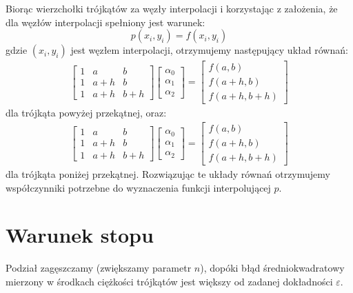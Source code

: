 \documentclass[12pt]{article}
\begin{document}
	Biorąc wierzchołki trójkątów za węzły interpolacji i korzystając z założenia, że dla węzłów interpolacji spełniony jest warunek:
	$$p(x_i, y_i) = f(x_i, y_i)$$
	gdzie $(x_i, y_i)$ jest węzłem interpolacji, otrzymujemy następujący układ równań:
	\begin{align*}
		\left[
			\begin{array}{ccc}
				1 &  a  &  b  \\
				1 & a+h &  b  \\
				1 & a+h & b+h
			\end{array}
		\right]
		\left[
			\begin{array}{c}
				\alpha_0 \\
				\alpha_1 \\
				\alpha_2
			\end{array}
		\right]
		=		
		\left[
			\begin{array}{c}
				  f(a, b)   \\
				 f(a+h, b)  \\
				f(a+h, b+h)
			\end{array}
		\right]
	\end{align*}
	dla trójkąta powyżej przekątnej, oraz:
	\begin{align*}
		\left[
			\begin{array}{ccc}
				1 &  a  &  b  \\
				1 & a+h &  b  \\
				1 & a+h & b+h
			\end{array}
		\right]
		\left[
			\begin{array}{c}
				\alpha_0 \\
				\alpha_1 \\
				\alpha_2
			\end{array}
		\right]
		=		
		\left[
			\begin{array}{c}
				  f(a, b)   \\
				 f(a+h, b)  \\
				f(a+h, b+h)
			\end{array}
		\right]
	\end{align*}
	dla trójkąta poniżej przekątnej. Rozwiązując te układy równań otrzymujemy współczynniki potrzebne do wyznaczenia funkcji interpolującej $p$.
	
	\section{Warunek stopu}
	Podział zagęszczamy (zwiększamy parametr $n$), dopóki błąd średniokwadratowy mierzony w środkach ciężkości trójkątów jest większy od zadanej dokładności $\varepsilon$.
	
\end{document}
